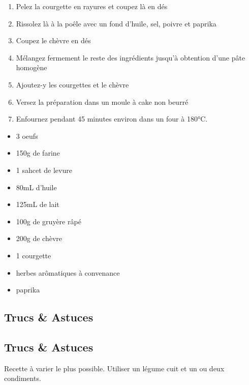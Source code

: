     \begin{minipage}{.7\textwidth}
        \begin{enumerate}
            \item Pelez la courgette en rayures et coupez là en dés
	    \item Rissolez là à la poêle avec un fond d'huile, sel, poivre et paprika
	    \item Coupez le chèvre en dés
	    \item Mélangez fermement le reste des ingrédients jusqu'à obtention d'une pâte homogène
	    \item Ajoutez-y les courgettes et le chèvre
	    \item Versez la préparation dans un moule à cake non beurré
	    \item Enfournez pendant 45 minutes environ dans un four à 180°C.

        \end{enumerate}
    \end{minipage}
    \begin{minipage}{.3\textwidth}
        \begin{flushleft}
        \begin{itemize}
            \item 3 oeufs
	    \item 150g de farine
	    \item 1 sahcet de levure
	    \item 80mL d'huile
	    \item 125mL de lait
	    \item 100g de gruyère râpé
	    \item 200g de chèvre
	    \item 1 courgette
	    \item herbes arômatiques à convenance
	    \item paprika

        \end{itemize}
        \end{flushleft}
    \end{minipage}
    
    \vspace{1cm}
    \hline
    \vspace{1cm}
    
    \subsection{Trucs \& Astuces}
        \subsection{Trucs \& Astuces}
	Recette à varier le plus possible. Utiliser un légume cuit et un ou deux condiments. 
